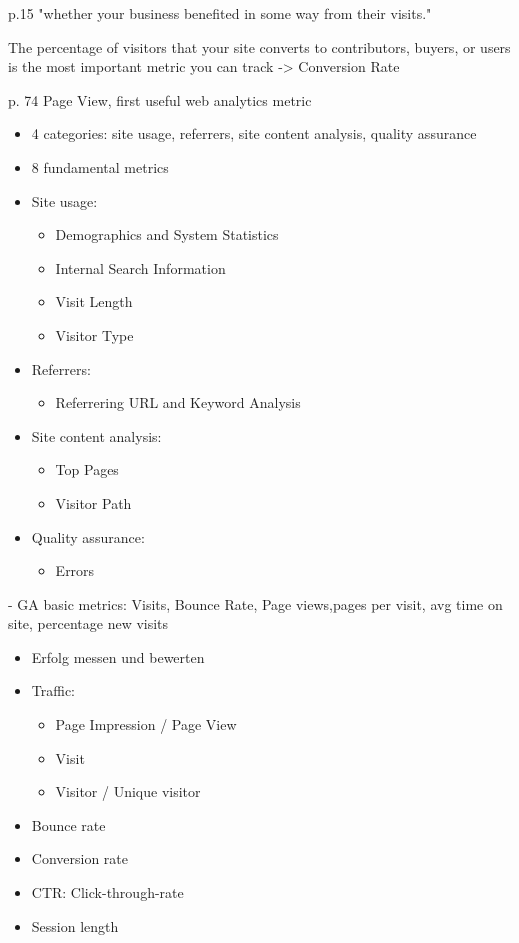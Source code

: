 p.15 "whether your business benefited in some way from their visits."

The percentage of visitors that your site converts to contributors, buyers, or users is the most important metric you can track -> Conversion Rate

p. 74 Page View, first useful web analytics metric






\begin{itemize}
\item 4 categories: site usage, referrers, site content analysis, quality assurance
\item 8 fundamental metrics
\item Site usage:
	\begin{itemize}
	\item Demographics and System Statistics
	\item Internal Search Information
	\item Visit Length
	\item Visitor Type
	\end{itemize}
\item Referrers:
	\begin{itemize}
	\item Referrering URL and Keyword Analysis
	\end{itemize}
\item Site content analysis:
	\begin{itemize}
	\item Top Pages
	\item Visitor Path
	\end{itemize}
\item Quality assurance:
	\begin{itemize}
	\item Errors
	\end{itemize}
\end{itemize}



- GA basic metrics: Visits, Bounce Rate, Page views,pages per visit, avg time on site, percentage new visits


\begin{itemize}
\item Erfolg messen und bewerten
\item Traffic:
	\begin{itemize}
	\item Page Impression / Page View
	\item Visit
	\item Visitor / Unique visitor
	\end{itemize}
\item Bounce rate
\item Conversion rate
\item CTR: Click-through-rate
\item Session length
\end{itemize}



